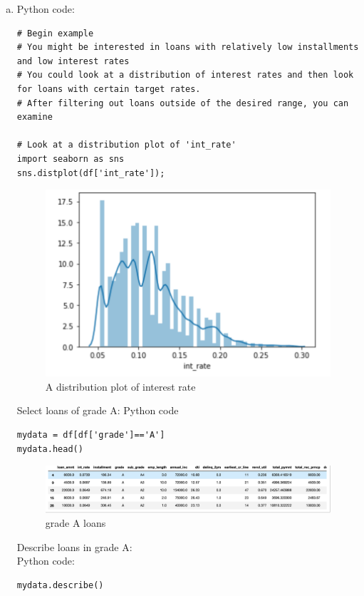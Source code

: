 \documentclass{article}
\begin{document}
\begin{enumerate}[(a)]
   \item Python code:
   \begin{verbatim}
# Begin example
# You might be interested in loans with relatively low installments and low interest rates
# You could look at a distribution of interest rates and then look for loans with certain target rates.
# After filtering out loans outside of the desired range, you can examine 

# Look at a distribution plot of 'int_rate'
import seaborn as sns
sns.distplot(df['int_rate']);
\end{verbatim}
\begin{figure}[h!]
    \centering
    \includegraphics[scale=0.50]{seaborn}
    \caption{A distribution plot of interest rate}
    \label{fig:original fico_hist}
    \end{figure}

Select loans of grade A: Python code
\begin{verbatim}
mydata = df[df['grade']=='A']
mydata.head()
\end{verbatim}

\begin{figure}[h!]
    \centering
    \includegraphics[scale=0.50]{gradeA}
    \caption{grade A loans}
    \label{fig:original fico_hist}
    \end{figure}
    
Describe loans in grade A:\\
Python code:
\begin{verbatim}
mydata.describe()
\end{verbatim}


\end{enumerate}
\end{document}
